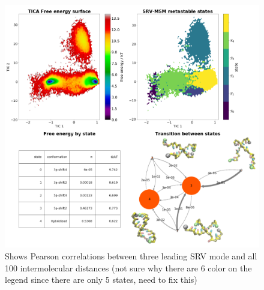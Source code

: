 \documentclass[journal=jpcbfk,manuscript=article]{achemso}
\begin{document}
\begin{figure}[ht!]
	\begin{center}
        \includegraphics[width=\textwidth]{Figs/figs_0804/GC-end_thermo.PNG}
        \caption{Shows Pearson correlations between three leading SRV mode and all 100 intermolecular distances (not sure why there are 6 color on the legend since there are only 5 states, need to fix this)}
        \label{fig:shifting_distributions}
	\end{center}
\end{figure}
\end{document}
